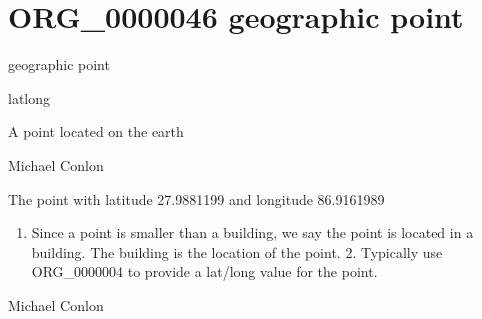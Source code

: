 \documentclass[letterpaper,10pt,english]{sphinxmanual}
\begin{document}
\section{ORG\_0000046 \sphinxhyphen{} geographic point}
\label{\detokenize{doc-ORG_0000046:org-0000046-geographic-point}}\label{\detokenize{doc-ORG_0000046:index-0}}\label{\detokenize{doc-ORG_0000046::doc}}
\begin{sphinxShadowBox}

\sphinxAtStartPar
geographic point
\end{sphinxShadowBox}

\begin{sphinxShadowBox}

\sphinxAtStartPar
latlong
\end{sphinxShadowBox}

\begin{sphinxShadowBox}

\sphinxAtStartPar
A point located on the earth
\end{sphinxShadowBox}

\begin{sphinxShadowBox}

\sphinxAtStartPar
Michael Conlon 
\end{sphinxShadowBox}

\begin{sphinxShadowBox}

\sphinxAtStartPar
The point with latitude 27.9881199 and longitude 86.9161989
\end{sphinxShadowBox}

\begin{sphinxShadowBox}
\begin{enumerate}
%
\item {} 
\sphinxAtStartPar
Since a point is smaller than a building, we say the point is located in a building.  The building is the location of the point.  2. Typically use ORG\_0000004 to provide a lat/long value for the point.

\end{enumerate}
\end{sphinxShadowBox}

\begin{sphinxShadowBox}

\sphinxAtStartPar
Michael Conlon 
\end{sphinxShadowBox}
\begin{quote}
\label{\detokenize{doc-ORG_0000047:org-0000047}}\label{\detokenize{doc-ORG_0000047:continent}}\label{\detokenize{doc-ORG_0000047:org-0000047}}
\ignorespaces \end{quote}
\end{document}
